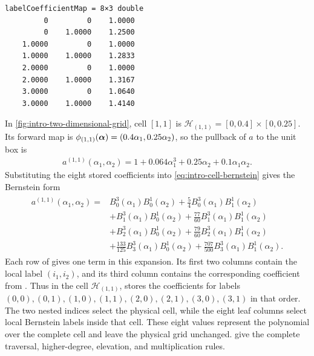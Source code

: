 \begin{lstlisting}[style=dpoutput]
labelCoefficientMap = 8×3 double
         0         0    1.0000
         0    1.0000    1.2500
    1.0000         0    1.0000
    1.0000    1.0000    1.2833
    2.0000         0    1.0000
    2.0000    1.0000    1.3167
    3.0000         0    1.0640
    3.0000    1.0000    1.4140
\end{lstlisting}

In \cref{fig:intro-two-dimensional-grid}, cell $[1,1]$ is $\mathcal H_{(1,1)}=[0,0.4]\times[0,0.25]$. Its forward map is $\phi_{(1,1)}(\boldsymbol{\alpha})=(0.4\alpha_1,0.25\alpha_2)$, so the pullback of $a$ to the unit box is
\begin{gather*}
    a^{(1,1)}(\alpha_1,\alpha_2)
    =1+0.064\alpha_1^3+0.25\alpha_2+0.1\alpha_1\alpha_2.
\end{gather*}
Substituting the eight stored coefficients into \cref{eq:intro-cell-bernstein} gives the Bernstein form
\begin{gather*}
    \begin{aligned}
        a^{(1,1)}(\alpha_1,\alpha_2)={}&
        B_0^3(\alpha_1)B_0^1(\alpha_2)
        +\frac{5}{4}B_0^3(\alpha_1)B_1^1(\alpha_2) \\
        &+B_1^3(\alpha_1)B_0^1(\alpha_2)
        +\frac{77}{60}B_1^3(\alpha_1)B_1^1(\alpha_2) \\
        &+B_2^3(\alpha_1)B_0^1(\alpha_2)
        +\frac{79}{60}B_2^3(\alpha_1)B_1^1(\alpha_2) \\
        &+\frac{133}{125}B_3^3(\alpha_1)B_0^1(\alpha_2)
        +\frac{707}{500}B_3^3(\alpha_1)B_1^1(\alpha_2).
    \end{aligned}
\end{gather*}
Each row of  gives one term in this expansion. Its first two columns contain the local label $(i_1,i_2)$, and its third column contains the corresponding coefficient from . Thus in the cell $\mathcal{H}_{(1,1)}$,  stores the coefficients for labels $(0,0),(0,1),(1,0),(1,1),(2,0),(2,1),(3,0),(3,1)$ in that order. The two nested indices select the physical cell, while the eight leaf columns select local Bernstein labels inside that cell. These eight values represent the polynomial over the complete cell and leave the physical grid unchanged.  give the complete traversal, higher-degree, elevation, and multiplication rules.


